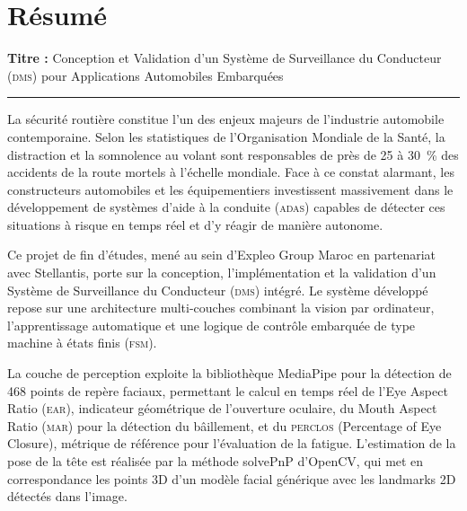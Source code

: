\documentclass[12pt,a4paper]{report}
\begin{document}
\clearpage

\chapter*{R\'esum\'e}
\thispagestyle{fancy}

\noindent\textbf{Titre :} Conception et Validation d'un Syst\`eme de Surveillance du Conducteur (\textsc{dms}) pour Applications Automobiles Embarqu\'ees

\noindent\rule{\linewidth}{0.5pt}
\vspace{0.3cm}

La s\'ecurit\'e routi\`ere constitue l'un des enjeux majeurs de l'industrie automobile contemporaine. Selon les statistiques de l'Organisation Mondiale de la Sant\'e, la distraction et la somnolence au volant sont responsables de pr\`es de 25 \`a 30~\% des accidents de la route mortels \`a l'\'echelle mondiale. Face \`a ce constat alarmant, les constructeurs automobiles et les \'equipementiers investissent massivement dans le d\'eveloppement de syst\`emes d'aide \`a la conduite (\textsc{adas}) capables de d\'etecter ces situations \`a risque en temps r\'eel et d'y r\'eagir de mani\`ere autonome.

Ce projet de fin d'\'etudes, men\'e au sein d'Expleo Group Maroc en partenariat avec Stellantis, porte sur la conception, l'impl\'ementation et la validation d'un Syst\`eme de Surveillance du Conducteur (\textsc{dms}) int\'egr\'e. Le syst\`eme d\'evelopp\'e repose sur une architecture multi-couches combinant la vision par ordinateur, l'apprentissage automatique et une logique de contr\^ole embarqu\'ee de type machine \`a \'etats finis (\textsc{fsm}).

La couche de perception exploite la biblioth\`eque MediaPipe pour la d\'etection de 468 points de rep\`ere faciaux, permettant le calcul en temps r\'eel de l'Eye Aspect Ratio (\textsc{ear}), indicateur g\'eom\'etrique de l'ouverture oculaire, du Mouth Aspect Ratio (\textsc{mar}) pour la d\'etection du b\^aillement, et du \textsc{perclos} (Percentage of Eye Closure), m\'etrique de r\'ef\'erence pour l'\'evaluation de la fatigue. L'estimation de la pose de la t\^ete est r\'ealis\'ee par la m\'ethode solvePnP d'OpenCV, qui met en correspondance les points 3D d'un mod\`ele facial g\'en\'erique avec les landmarks 2D d\'etect\'es dans l'image.
\end{document}
